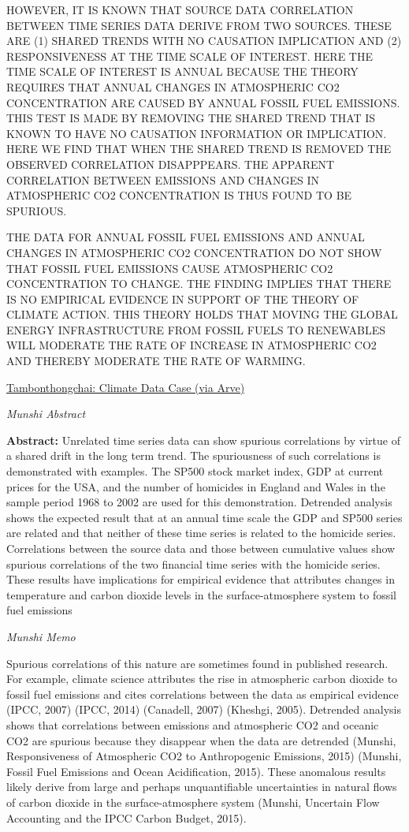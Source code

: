 \documentclass[
]{book}
\begin{document}
HOWEVER, IT IS KNOWN THAT SOURCE DATA CORRELATION BETWEEN TIME SERIES DATA DERIVE FROM TWO SOURCES. THESE ARE (1) SHARED TRENDS WITH NO CAUSATION IMPLICATION AND (2) RESPONSIVENESS AT THE TIME SCALE OF INTEREST. HERE THE TIME SCALE OF INTEREST IS ANNUAL BECAUSE THE THEORY REQUIRES THAT ANNUAL CHANGES IN ATMOSPHERIC CO2 CONCENTRATION ARE CAUSED BY ANNUAL FOSSIL FUEL EMISSIONS. THIS TEST IS MADE BY REMOVING THE SHARED TREND THAT IS KNOWN TO HAVE NO CAUSATION INFORMATION OR IMPLICATION. HERE WE FIND THAT WHEN THE SHARED TREND IS REMOVED THE OBSERVED CORRELATION DISAPPPEARS. THE APPARENT CORRELATION BETWEEN EMISSIONS AND CHANGES IN ATMOSPHERIC CO2 CONCENTRATION IS THUS FOUND TO BE SPURIOUS.

THE DATA FOR ANNUAL FOSSIL FUEL EMISSIONS AND ANNUAL CHANGES IN ATMOSPHERIC CO2 CONCENTRATION DO NOT SHOW THAT FOSSIL FUEL EMISSIONS CAUSE ATMOSPHERIC CO2 CONCENTRATION TO CHANGE. THE FINDING IMPLIES THAT THERE IS NO EMPIRICAL EVIDENCE IN SUPPORT OF THE THEORY OF CLIMATE ACTION. THIS THEORY HOLDS THAT MOVING THE GLOBAL ENERGY INFRASTRUCTURE FROM FOSSIL FUELS TO RENEWABLES WILL MODERATE THE RATE OF INCREASE IN ATMOSPHERIC CO2 AND THEREBY MODERATE THE RATE OF WARMING.

\href{https://tambonthongchai.com/2020/11/11/annual-changes-in-mlo-co2/}{Tambonthongchai: Climate Data Case (via Arve)}

\emph{Munshi Abstract}

\textbf{Abstract:} Unrelated time series data can show spurious correlations by virtue of a shared drift in the long term trend. The
spuriousness of such correlations is demonstrated with examples. The SP500 stock market index, GDP at current prices for the
USA, and the number of homicides in England and Wales in the sample period 1968 to 2002 are used for this demonstration.
Detrended analysis shows the expected result that at an annual time scale the GDP and SP500 series are related and that
neither of these time series is related to the homicide series. Correlations between the source data and those between
cumulative values show spurious correlations of the two financial time series with the homicide series.
These results have implications for empirical evidence that attributes changes in temperature and carbon dioxide levels in the surface-atmosphere system to fossil fuel emissions

\emph{Munshi Memo}

Spurious correlations of this nature are sometimes found in published research. For example, climate
science attributes the rise in atmospheric carbon dioxide to fossil fuel emissions and cites correlations
between the data as empirical evidence (IPCC, 2007) (IPCC, 2014) (Canadell, 2007) (Kheshgi, 2005).
Detrended analysis shows that correlations between emissions and atmospheric CO2 and oceanic CO2
are spurious because they disappear when the data are detrended (Munshi, Responsiveness of
Atmospheric CO2 to Anthropogenic Emissions, 2015) (Munshi, Fossil Fuel Emissions and Ocean
Acidification, 2015). These anomalous results likely derive from large and perhaps unquantifiable
uncertainties in natural flows of carbon dioxide in the surface-atmosphere system (Munshi, Uncertain
Flow Accounting and the IPCC Carbon Budget, 2015).
\end{document}
